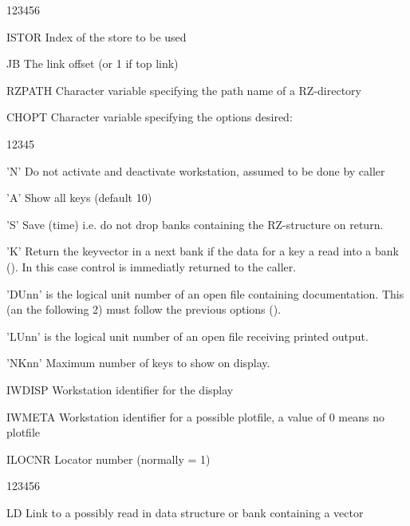 \Idesc
 
\begin{DLtt}{123456}
\item[ISTOR]  Index of the store to be used
\item[JB]     The link offset (or 1 if top link)
\item[RZPATH] Character variable specifying the path name of a RZ-directory
\item[CHOPT]  Character variable specifying the options desired:
  \begin{DLtt}{12345}
    \item['N']    Do not activate and deactivate workstation,
                  assumed to be done by caller
    \item['A']    Show all keys (default 10)
    \item['S']    Save (time) i.e. do not drop banks containing
                  the RZ-structure on return.
    \item['K']    Return the keyvector in a next bank if the data for
                  a key a read into a bank (). 
                  In this case control is immediatly returned to the caller.
    \item['DUnn']  is the logical unit number of an open file
                  containing documentation. This (an the following 2)
                  must follow the previous options ().
    \item['LUnn']  is the logical unit number of an open file
                  receiving printed output.
    \item['NKnn'] Maximum number of keys to show on display.
  \end{DLtt}
\item[IWDISP] Workstation identifier for the display
\item[IWMETA] Workstation identifier for a possible plotfile,
              a value of 0 means no plotfile
\item[ILOCNR] Locator number (normally = 1)
\end{DLtt}
 
\Odesc
 
\begin{DLtt}{123456}
\item[LD]  Link to a possibly read in data structure or bank containing a vector
\end{DLtt}
 
